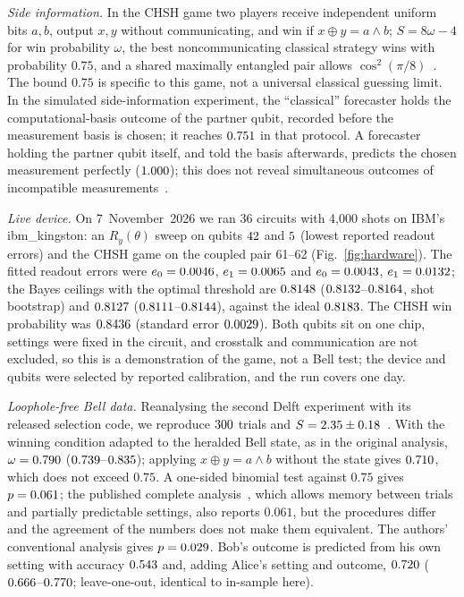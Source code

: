 \documentclass[journal]{IEEEtran}
\theoremstyle{definition}
\begin{document}
\emph{Side information.} In the CHSH game two players receive independent uniform bits $a,b$, output $x,y$ without communicating, and win if $x\oplus y=a\wedge b$; $S=8\omega-4$ for win probability $\omega$, the best noncommunicating classical strategy wins with probability $0.75$, and a shared maximally entangled pair allows $\cos^2(\pi/8)$~\cite{clauser1969proposed,tsirelson1980quantum}. The bound $0.75$ is specific to this game, not a universal classical guessing limit. In the simulated side-information experiment, the ``classical'' forecaster holds the computational-basis outcome of the partner qubit, recorded before the measurement basis is chosen; it reaches $0.751$ in that protocol. A forecaster holding the partner qubit itself, and told the basis afterwards, predicts the chosen measurement perfectly ($1.000$); this does not reveal simultaneous outcomes of incompatible measurements~\cite{berta2010uncertainty,konig2009operational}.

\emph{Live device.} On 7~November~2026 we ran 36 circuits with 4{,}000 shots on IBM's ibm\_kingston: an $R_y(\theta)$ sweep on qubits $42$ and $5$ (lowest reported readout errors) and the CHSH game on the coupled pair 61--62 (Fig.~\ref{fig:hardware}). The fitted readout errors were $e_0=0.0046$, $e_1=0.0065$ and $e_0=0.0043$, $e_1=0.0132$; the Bayes ceilings with the optimal threshold are $0.8148$ ($0.8132$--$0.8164$, shot bootstrap) and $0.8127$ ($0.8111$--$0.8144$), against the ideal $0.8183$. The CHSH win probability was $0.8436$ (standard error $0.0029$). Both qubits sit on one chip, settings were fixed in the circuit, and crosstalk and communication are not excluded, so this is a demonstration of the game, not a Bell test; the device and qubits were selected by reported calibration, and the run covers one day.

\emph{Loophole-free Bell data.} Reanalysing the second Delft experiment with its released selection code, we reproduce $300$ trials and $S=2.35\pm0.18$~\cite{hensen2016second}. With the winning condition adapted to the heralded Bell state, as in the original analysis, $\omega=0.790$ ($0.739$--$0.835$); applying $x\oplus y=a\wedge b$ without the state gives $0.710$, which does not exceed $0.75$. A one-sided binomial test against $0.75$ gives $p=0.061$; the published complete analysis~\cite{hensen2016second,elkouss2016nearly}, which allows memory between trials and partially predictable settings, also reports $0.061$, but the procedures differ and the agreement of the numbers does not make them equivalent. The authors' conventional analysis gives $p=0.029$. Bob's outcome is predicted from his own setting with accuracy $0.543$ and, adding Alice's setting and outcome, $0.720$ ($0.666$--$0.770$; leave-one-out, identical to in-sample here).
\end{document}
